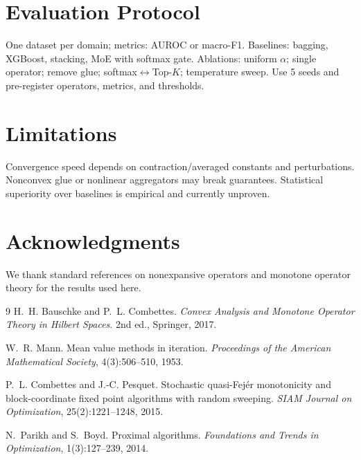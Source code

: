 \documentclass[11pt]{article}
\theoremstyle{definition}
\begin{document}
\section{Evaluation Protocol}
One dataset per domain; metrics: AUROC or macro-F1. Baselines: bagging, XGBoost, stacking, MoE with softmax gate. Ablations: uniform $\alpha$; single operator; remove glue; softmax$\leftrightarrow$Top-$K$; temperature sweep. Use 5 seeds and pre-register operators, metrics, and thresholds.

\section{Limitations}
Convergence speed depends on contraction/averaged constants and perturbations. Nonconvex glue or nonlinear aggregators may break guarantees. Statistical superiority over baselines is empirical and currently unproven.

\section*{Acknowledgments}
We thank standard references on nonexpansive operators and monotone operator theory for the results used here.

\begin{thebibliography}{9}
H.~H. Bauschke and P.~L. Combettes.
\newblock \emph{Convex Analysis and Monotone Operator Theory in Hilbert Spaces}. 2nd ed., Springer, 2017.

W.~R. Mann.
\newblock Mean value methods in iteration.
\newblock \emph{Proceedings of the American Mathematical Society}, 4(3):506--510, 1953.

P.~L. Combettes and J.-C. Pesquet.
\newblock Stochastic quasi-Fej\'er monotonicity and block-coordinate fixed point algorithms with random sweeping.
\newblock \emph{SIAM Journal on Optimization}, 25(2):1221--1248, 2015.

N.~Parikh and S.~Boyd.
\newblock Proximal algorithms.
\newblock \emph{Foundations and Trends in Optimization}, 1(3):127--239, 2014.
\end{thebibliography}
\end{document}
